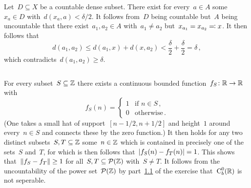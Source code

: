 \section{}



\subsection{}
\label{criterion for nonseperable}

Let~$D \subseteq X$ be a countable dense subset.
There exist for every~$a \in A$ some~$x_a \in D$ with~$d(x_a, a) < \delta/2$.
It follows from~$D$ being countable but~$A$ being uncountable that there exist~$a_1, a_2 \in A$ with~$a_1 \neq a_2$ but~$x_{a_1} = x_{a_2} \eqqcolon x$.
It then follows that
\[
        d(a_1, a_2)
  \leq  d(a_1, x) + d(x, a_2)
  <     \frac{\delta}{2} + \frac{\delta}{2}
  =     \delta \,,
\]
which contradicts~$d(a_1, a_2) \geq \delta$.





\subsection{}

For every subset~$S \subseteq \mathbb{Z}$ there exists a continuous bounded function~$f_S \colon \mathbb{R} \to \mathbb{R}$ with
\[
    f_S(n)
  = \begin{cases}
      1 & \text{if~$n \in S$} \,, \\
      0 & \text{otherwise} \,.
    \end{cases}
\]
(One takes a small hat of support~$[n - 1/2, n + 1/2]$ and height~$1$ around every~$n \in S$ and connects these by the zero function.)
It then holds for any two distinct subsets~$S, T \subseteq \mathbb{Z}$ some~$n \in \mathbb{Z}$ which is contained in precisely one of the sets~$S$ and~$T$, for which is then follows that~$\lvert f_S(n) - f_T(n)\rvert = 1$.
This shows that~$\lVert f_S - f_T\rVert \geq 1$ for all~$S, T \subseteq \mathcal{P}(\mathbb{Z})$ with~$S \neq T$.
It follows from the uncountability of the power set~$\mathcal{P}(\mathbb{Z})$ by part~\ref{criterion for nonseperable} of the exercise that~$\operatorname{C}^0_b(\mathbb{R})$ is not seperable.





\subsection{}

